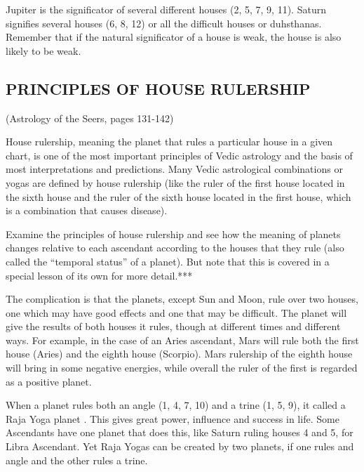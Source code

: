 Jupiter is the significator of several different houses (2, 5, 7, 9, 11). Saturn signifies several houses (6, 8, 12) or all the difficult houses or duhsthanas. Remember that if the natural significator of a house is weak, the house is also likely to be weak.

 

\subsection{PRINCIPLES OF HOUSE RULERSHIP} (Astrology of the Seers, pages 131-142)

 

House rulership, meaning the planet that rules a particular house in a given chart, is one of the most important principles of Vedic astrology and the basis of most interpretations and predictions. Many Vedic astrological combinations or yogas are defined by house rulership (like the ruler of the first house located in the sixth house and the ruler of the sixth house located in the first house, which is a combination that causes disease).

 

Examine the principles of house rulership and see how the meaning of planets changes relative to each ascendant according to the houses that they rule (also called the “temporal status” of a planet). But note that this is covered in a special lesson of its own for more detail.***

 

The complication is that the planets, except Sun and Moon, rule over two houses, one which may have good effects and one that may be difficult. The planet will give the results of both houses it rules, though at different times and different ways. For example, in the case of an Aries ascendant, Mars will rule both the first house (Aries) and the eighth house (Scorpio). Mars rulership of the eighth house will bring in some negative energies, while overall the ruler of the first is regarded as a positive planet.

 

When a planet rules both an angle (1, 4, 7, 10) and a trine (1, 5, 9), it  called a Raja Yoga planet . This gives great power, influence and success in life. Some Ascendants have one planet that does this, like Saturn ruling houses 4 and 5, for Libra Ascendant. Yet Raja Yogas can be created by two planets, if one rules and angle and the other rules a trine.

 

